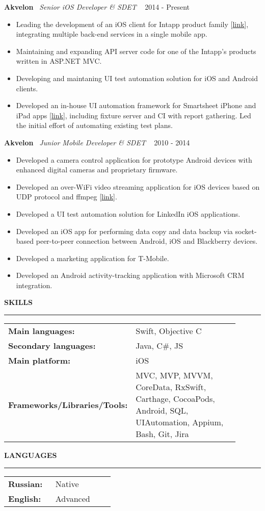 \documentclass{article}
\newcommand{\cvsection}[1]{
  \vspace{2.6ex}
  \noindent\textbf{\large{\uppercase{#1}}}
  \vspace{1ex}
  \hrule
  \vspace{1.5ex}
}
\newcommand{\cvparagraph}[3]{
  \noindent\indent
  \textbf{#1}
  \ 
  \textit{#2}
  \ 
  \hfill{}
  {#3}\vspace{1ex}
}
\begin{document}
\cvparagraph{Akvelon}{Senior iOS Developer \& SDET}{2014 - Present}
\begin{itemize}[topsep=0ex,leftmargin=*,itemsep=0ex,parsep=1ex]
  \item Leading the development of an iOS client for Intapp product family [\href{https://itunes.apple.com/us/app/intapp/id1052877767}{link}], integrating multiple back-end services in a single mobile app.
  \item Maintaining and expanding API server code for one of the Intapp's products written in ASP.NET MVC.
  \item Developing and maintaning UI test automation solution for iOS and Android clients.
  \item Developed an in-house UI automation framework for Smartsheet iPhone and iPad apps [\href{https://itunes.apple.com/us/app/smartsheet/id568421135}{link}], including fixture server and CI with report gathering. Led the initial effort of automating existing test plans.
\end{itemize}
\vspace{1ex}
\cvparagraph{Akvelon}{Junior Mobile Developer \& SDET}{2010 - 2014}
\begin{itemize}[topsep=0ex,leftmargin=*,itemsep=0ex,parsep=1ex]
  \item Developed a camera control application for prototype Android devices with enhanced digital cameras and proprietary firmware.
  \item Developed an over-WiFi video streaming application for iOS devices based on UDP protocol and ffmpeg [\href{http://neuronbeta.com/chirpglobal/chirpvision/app/}{link}].
  \item Developed a UI test automation solution for LinkedIn iOS applications.
  \item Developed an iOS app for performing data copy and data backup via socket-based peer-to-peer connection between Android, iOS and Blackberry devices.
  \item Developed a marketing application for T-Mobile.
  \item Developed an Android activity-tracking application with Microsoft CRM integration.
\end{itemize}

\cvsection{Skills}
{\renewcommand{\arraystretch}{1.2}
\begin{tabular}{p{0.4\linewidth}p{0.5\linewidth}}
  \textbf{Main languages:} & Swift, Objective C \\
  \textbf{Secondary languages:} & Java, C\#, JS \\
  \textbf{Main platform:} & iOS \\
  \textbf{Frameworks/Libraries/Tools:} & MVC, MVP, MVVM, CoreData, RxSwift, Carthage, CocoaPods, Android, SQL, UIAutomation, Appium, Bash, Git, Jira
\end{tabular}}

\cvsection{Languages}
{\renewcommand{\arraystretch}{1.2}
\begin{tabular}{p{0.4\linewidth}p{0.5\linewidth}}
  \textbf{Russian:} & Native \\
  \textbf{English:} & Advanced \\
\end{tabular}}
\end{document}
